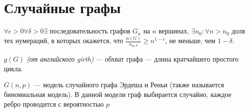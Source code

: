 
\section{Случайные графы}
\begin{theorem}[Кучера]
    \(\forall \epsilon > 0 \forall \delta > 0 \exists \) последовательность графов \(G_n\) на \(n\) вершинах, \(\exists n_0: \forall n > n_0\) доля тех нумераций, в которых окажется, что \(\frac{\alpha(G)}{\alpha_{\text{ж}, \sigma}} \ge n^{1 - \epsilon}\), не меньше, чем \(1 - \delta\).
\end{theorem}

\begin{definition}
    \(g(G)\) \textit{(от английского girth)} --- обхват графа --- длина кратчайшего простого цикла.
\end{definition}

\begin{definition}
    \(G(n, p)\) --- модель случайного графа Эрдеша и Реньи (также называется биномиальная модель). В данной модели граф выбирается случайно, каждое ребро проводится с вероятностью \(p\)
\end{definition}

